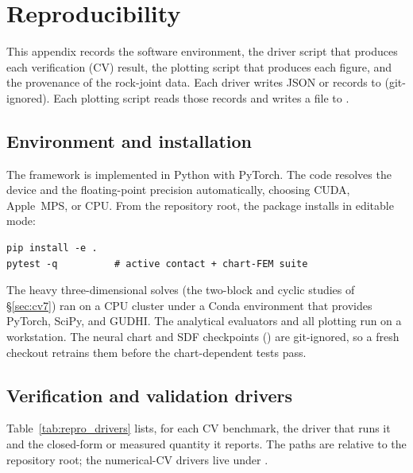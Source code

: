 \section{Reproducibility}\label{app:repro}

This appendix records the software environment, the driver script that produces each
verification (CV) result, the plotting script that produces each figure, and the provenance
of the rock-joint data. Each driver writes JSON or  records to
 (git-ignored). Each plotting script reads those records and writes a
 file to .

\subsection{Environment and installation}

The framework is implemented in Python with PyTorch. The code resolves the device and the
floating-point precision automatically, choosing CUDA, Apple~MPS, or CPU. From the repository
root, the package installs in editable mode:

\begin{verbatim}
pip install -e .
pytest -q          # active contact + chart-FEM suite
\end{verbatim}

\noindent The heavy three-dimensional solves (the two-block and cyclic studies of
\S\ref{sec:cv7}) ran on a CPU cluster under a Conda environment that provides PyTorch,
SciPy, and GUDHI. The analytical evaluators and all plotting run on a workstation. The neural
chart and SDF checkpoints () are git-ignored, so a fresh checkout retrains them
before the chart-dependent tests pass.

\subsection{Verification and validation drivers}

Table~\ref{tab:repro_drivers} lists, for each CV benchmark, the driver that runs it and the
closed-form or measured quantity it reports. The paths are relative to the repository root;
the numerical-CV drivers live under .

